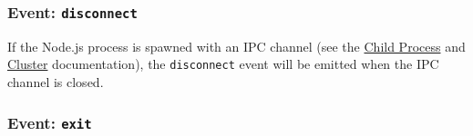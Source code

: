 \begin{Shaded}
\begin{Highlighting}[]
  \OperatorTok{=} \NormalTok{(}\NormalTok{)}\OperatorTok{;}

\NormalTok{(}\OperatorTok{,}\KeywordTok{=\textgreater{}}\NormalTok{ \{}
  \NormalTok{(}\OperatorTok{,}\OperatorTok{;}
\NormalTok{\})}\OperatorTok{;}

\NormalTok{(}\OperatorTok{,}\KeywordTok{=\textgreater{}}\NormalTok{ \{}
  \NormalTok{(}\OperatorTok{,}\OperatorTok{;}
\NormalTok{\})}\OperatorTok{;}

\NormalTok{(}\NormalTok{)}\OperatorTok{;}

\end{Highlighting}
\end{Shaded}

\subsubsection{\texorpdfstring{Event:
\texttt{\textquotesingle{}disconnect\textquotesingle{}}}{Event: \textquotesingle disconnect\textquotesingle{}}}\label{event-disconnect}

If the Node.js process is spawned with an IPC channel (see the
\href{child_process.md}{Child Process} and \href{cluster.md}{Cluster}
documentation), the
\texttt{\textquotesingle{}disconnect\textquotesingle{}} event will be
emitted when the IPC channel is closed.

\subsubsection{\texorpdfstring{Event:
\texttt{\textquotesingle{}exit\textquotesingle{}}}{Event: \textquotesingle exit\textquotesingle{}}}\label{event-exit}

